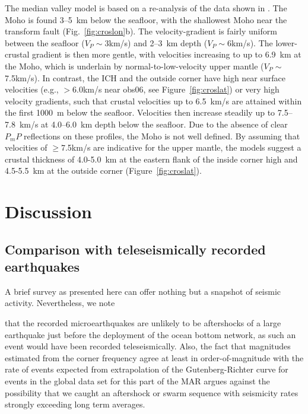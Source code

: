 \documentclass[aguplus]{aguplus}
\newlength{\tw}
\begin{document}
\begin{article}
The median valley model is based on a re-analysis of the data
shown in \citet[Figures 5 and 6]{reston02}.  The Moho is found 3--5~km
below the seafloor, with the shallowest Moho near the transform fault
(Fig.~\ref{fig:croslon}b). The velocity-gradient is fairly
uniform between the seafloor ($V_P\sim3$km/s) and 2--3~km depth
($V_P\sim 6$km/s). The lower-crustal gradient is then more gentle,
with velocities increasing to up to 6.9~km at the Moho, which is
underlain by normal-to-low-velocity upper mantle ($V_P\sim$7.5km/s).
 In contrast,
 the ICH and
 the outside corner have high near surface
velocities (e.g., $>$6.0km/s near obs06, see Figure~\ref{fig:croslat}) or very high velocity
gradients, such that crustal velocities up to 6.5~km/s are attained within the
first 1000~m below the seafloor. Velocities then  increase steadily up to
 7.5--7.8~km/s at 4.0--6.0~km depth below the seafloor. Due to the
absence of clear $P_mP$ reflections on these profiles, the Moho is not well defined. By
assuming that velocities of $\geq$7.5km/s are indicative for the upper
mantle, the models suggest a crustal thickness of 4.0-5.0~km at the
eastern flank of the inside corner high and 4.5-5.5~km at the outside
corner (Figure~\ref{fig:croslat}).

\section{Discussion}

\subsection{Comparison with teleseismically recorded earthquakes}

A brief survey as presented here can offer nothing but a snapshot
of seismic activity. Nevertheless, we note

that the recorded microearthquakes are unlikely to be
aftershocks of a large earthquake just before the deployment of the
ocean bottom network, as such an event would have been recorded
teleseismically.
 Also,
the fact that magnitudes estimated from the corner frequency agree at
least in order-of-magnitude with the rate of events expected from
extrapolation of the Gutenberg-Richter curve for events in the global
data set for this part of the MAR argues against the possibility that
we caught an aftershock or swarm sequence with
seismicity rates strongly exceeding long term averages.



\end{article}
\end{document}
